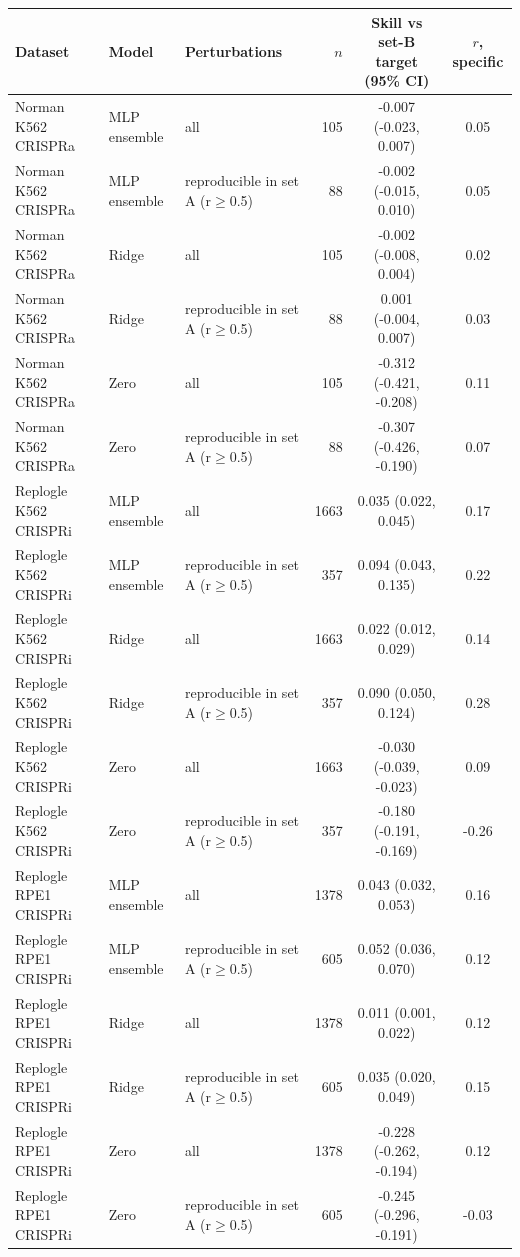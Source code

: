\begin{tabular}{lllrcc}
\toprule
Dataset & Model & Perturbations & $n$ & Skill vs set-B target (95\% CI) & $r$, specific \\
\midrule
Norman K562 CRISPRa & MLP ensemble & all & 105 & -0.007 (-0.023, 0.007) & 0.05 \\
Norman K562 CRISPRa & MLP ensemble & reproducible in set A (r$\ge$0.5) & 88 & -0.002 (-0.015, 0.010) & 0.05 \\
Norman K562 CRISPRa & Ridge & all & 105 & -0.002 (-0.008, 0.004) & 0.02 \\
Norman K562 CRISPRa & Ridge & reproducible in set A (r$\ge$0.5) & 88 & 0.001 (-0.004, 0.007) & 0.03 \\
Norman K562 CRISPRa & Zero & all & 105 & -0.312 (-0.421, -0.208) & 0.11 \\
Norman K562 CRISPRa & Zero & reproducible in set A (r$\ge$0.5) & 88 & -0.307 (-0.426, -0.190) & 0.07 \\
Replogle K562 CRISPRi & MLP ensemble & all & 1663 & 0.035 (0.022, 0.045) & 0.17 \\
Replogle K562 CRISPRi & MLP ensemble & reproducible in set A (r$\ge$0.5) & 357 & 0.094 (0.043, 0.135) & 0.22 \\
Replogle K562 CRISPRi & Ridge & all & 1663 & 0.022 (0.012, 0.029) & 0.14 \\
Replogle K562 CRISPRi & Ridge & reproducible in set A (r$\ge$0.5) & 357 & 0.090 (0.050, 0.124) & 0.28 \\
Replogle K562 CRISPRi & Zero & all & 1663 & -0.030 (-0.039, -0.023) & 0.09 \\
Replogle K562 CRISPRi & Zero & reproducible in set A (r$\ge$0.5) & 357 & -0.180 (-0.191, -0.169) & -0.26 \\
Replogle RPE1 CRISPRi & MLP ensemble & all & 1378 & 0.043 (0.032, 0.053) & 0.16 \\
Replogle RPE1 CRISPRi & MLP ensemble & reproducible in set A (r$\ge$0.5) & 605 & 0.052 (0.036, 0.070) & 0.12 \\
Replogle RPE1 CRISPRi & Ridge & all & 1378 & 0.011 (0.001, 0.022) & 0.12 \\
Replogle RPE1 CRISPRi & Ridge & reproducible in set A (r$\ge$0.5) & 605 & 0.035 (0.020, 0.049) & 0.15 \\
Replogle RPE1 CRISPRi & Zero & all & 1378 & -0.228 (-0.262, -0.194) & 0.12 \\
Replogle RPE1 CRISPRi & Zero & reproducible in set A (r$\ge$0.5) & 605 & -0.245 (-0.296, -0.191) & -0.03 \\

\end{tabular}
